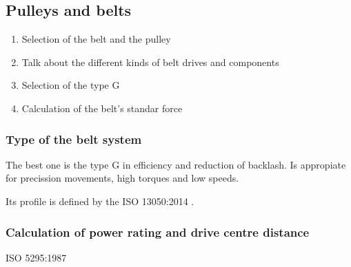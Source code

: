 \subsection{Pulleys and belts} %
\label{sub:pulleys_and_belts}

  \begin{enumerate}
    \item Selection of the belt and the pulley
    \item Talk about the different kinds of belt drives and components
    \item Selection of the type G
    \item Calculation of the belt's standar force
  \end{enumerate}

  
  \subsubsection{Type of the belt system}  %
  \label{ssub:type_of_the_belt_system}
  

  The best one is the type G in efficiency and reduction of backlash.
  Is appropiate for precission movements, high torques and low speeds.

  Its profile is defined by the ISO 13050:2014 \cite{ISO13050}.


  \subsubsection{Calculation of power rating and drive centre distance} %
  \label{ssub:calculation_of_power_rating_and_drive_centre_distance}
  ISO 5295:1987 \cite{ISO5295}
  

